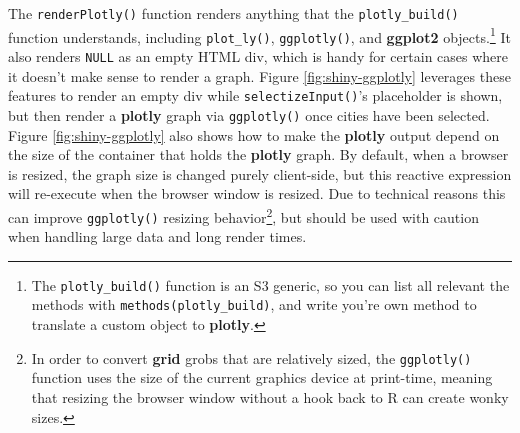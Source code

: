 \documentclass[
  12pt,
]{krantz}
\begin{document}
The \texttt{renderPlotly()} function renders anything that the \texttt{plotly\_build()} function understands, including \texttt{plot\_ly()}, \texttt{ggplotly()}, and \textbf{ggplot2} objects.\footnote{The \texttt{plotly\_build()} function is an S3 generic, so you can list all relevant the methods with \texttt{methods(plotly\_build)}, and write you're own method to translate a custom object to \textbf{plotly}.} It also renders \texttt{NULL} as an empty HTML div, which is handy for certain cases where it doesn't make sense to render a graph. Figure \ref{fig:shiny-ggplotly} leverages these features to render an empty div while \texttt{selectizeInput()}'s placeholder is shown, but then render a \textbf{plotly} graph via \texttt{ggplotly()} once cities have been selected. Figure \ref{fig:shiny-ggplotly} also shows how to make the \textbf{plotly} output depend on the size of the container that holds the \textbf{plotly} graph. By default, when a browser is resized, the graph size is changed purely client-side, but this reactive expression will re-execute when the browser window is resized. Due to technical reasons this can improve \texttt{ggplotly()} resizing behavior\footnote{In order to convert \textbf{grid} grobs that are relatively sized, the \texttt{ggplotly()} function uses the size of the current graphics device at print-time, meaning that resizing the browser window without a hook back to R can create wonky sizes.}, but should be used with caution when handling large data and long render times.
\end{document}
